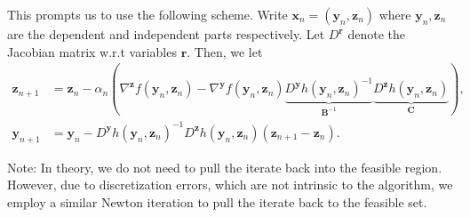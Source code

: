 This prompts us to use the following scheme. Write $\mathbf{x}_n = (\mathbf{y}_n, \mathbf{z}_n)$ where $\mathbf{y}_n, \mathbf{z}_n$ are the dependent and independent parts respectively. Let $D^{\mathbf{r}}$ denote the Jacobian matrix w.r.t variables $\mathbf{r}$. Then, we let
\begin{align*}
    \mathbf{z}_{n+1} &= \mathbf{z}_n - \alpha_n \left( \nabla^{\mathbf{z}} f(\mathbf{y}_n, \mathbf{z}_n) - \nabla^{\mathbf{y}} f(\mathbf{y}_n, \mathbf{z}_n) \underbrace{D^{\mathbf{y}} h(\mathbf{y}_n, \mathbf{z}_n)^{-1}}_{\mathbf{B}^{-1}} \underbrace{D^{\mathbf{z}} h(\mathbf{y}_n, \mathbf{z}_n)}_{\mathbf{C}}  \right), \\
    \mathbf{y}_{n+1} &= \mathbf{y}_n - D^{\mathbf{y}} h(\mathbf{y}_n, \mathbf{z}_n)^{-1} D^{\mathbf{z}} h(\mathbf{y}_n, \mathbf{z}_n) \left( \mathbf{z}_{n+1} - \mathbf{z}_n \right).
\end{align*}

Note: In theory, we do not need to pull the iterate back into the feasible region. However, due to discretization errors, which are not intrinsic to the algorithm, we employ a similar Newton iteration to pull the iterate back to the feasible set.  